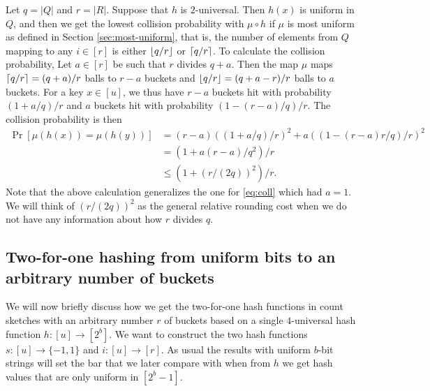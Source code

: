 Let $q=|Q|$ and $r=|R|$.
Suppose that $h$ is $2$-universal.
Then $h(x)$ is uniform in $Q$, and then we get the lowest collision probability with $\mu\circ h$ if $\mu$ is most uniform as defined in Section \ref{sec:most-uniform}, that is, the number of elements from $Q$ mapping to any $i\in[r]$ is either $\lfloor {q/r} \rfloor$ or $\lceil {q/r}\rceil$.
To calculate the collision probability, Let $a\in[r]$ be such that $r$ divides $q+a$.
Then the map $\mu$ maps $\lceil {q/r}\rceil=(q+a)/r$ balls to $r-a$ buckets and $\lfloor {q/r} \rfloor=(q+a-r)/r$ balls to $a$ buckets.
For a key $x\in [u]$, we thus have $r-a$ buckets hit with probability $(1+a/q)/r$ and $a$ buckets hit with probability $(1-(r-a)/q)/r$.
The collision probability is then
\begin{equation}
   \begin{split}
      \Pr[\mu(h(x))=\mu(h(y))] &= (r-a)((1+a/q)/r)^2+a((1-(r-a)r/q)/r)^2   \\&=(1+a(r-a)/q^2)/r \\&\le \left(1+(r/(2q))^2\right)/r.
      \label{eq:coll-a}
   \end{split}
\end{equation}
Note that the above calculation generalizes the one for \eqref{eq:coll} which had $a=1$.
We will think of $(r/(2q))^2$ as the general relative rounding cost when we do not have any information about how $r$ divides $q$.

\subsection{Two-for-one hashing from uniform bits to an arbitrary number of buckets}
We will now briefly discuss how we get the two-for-one hash functions in count sketches with an arbitrary number $r$ of buckets based on a single $4$-universal hash function $h:[u]\to [2^b]$.
We want to construct the two hash functions $s:[u]\to\{-1,1\}$ and $i:[u]\to[r]$.
As usual the results with uniform $b$-bit strings will set the bar that we later compare with when from $h$ we get hash values that are only uniform in $[2^b-1]$.

